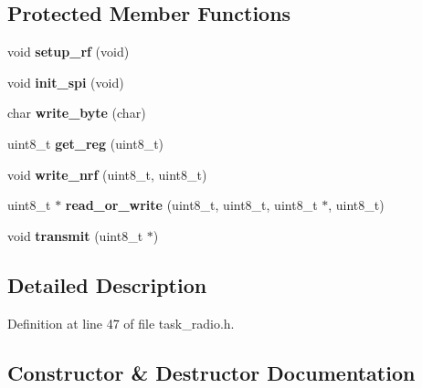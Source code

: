 \subsection*{Protected Member Functions}
\begin{DoxyCompactItemize}
\item 
\mbox{\label{classtask__radio_a59772aadb73eef73bdbea1442d114490}} 
void {\bfseries setup\+\_\+rf} (void)
\item 
\mbox{\label{classtask__radio_ae65a87dacc155acdc221ca640a6812f8}} 
void {\bfseries init\+\_\+spi} (void)
\item 
\mbox{\label{classtask__radio_ae18b22460053f286ad2327b785cfa018}} 
char {\bfseries write\+\_\+byte} (char)
\item 
\mbox{\label{classtask__radio_a864714d4a62ca47b6852272d70aa0a0e}} 
uint8\+\_\+t {\bfseries get\+\_\+reg} (uint8\+\_\+t)
\item 
\mbox{\label{classtask__radio_a4c451948697170e43a0b79674b76d5a6}} 
void {\bfseries write\+\_\+nrf} (uint8\+\_\+t, uint8\+\_\+t)
\item 
\mbox{\label{classtask__radio_a06d1554c99f26f78698d156f8a729ec7}} 
uint8\+\_\+t $\ast$ {\bfseries read\+\_\+or\+\_\+write} (uint8\+\_\+t, uint8\+\_\+t, uint8\+\_\+t $\ast$, uint8\+\_\+t)
\item 
\mbox{\label{classtask__radio_ae86d2810bfbf4174f73b6c975f2deef4}} 
void {\bfseries transmit} (uint8\+\_\+t $\ast$)
\end{DoxyCompactItemize}


\subsection{Detailed Description}


Definition at line 47 of file task\+\_\+radio.\+h.



\subsection{Constructor \& Destructor Documentation}
\mbox{\label{classtask__radio_ad6d6a721a2642bb3074d682ea880aa30}} 
